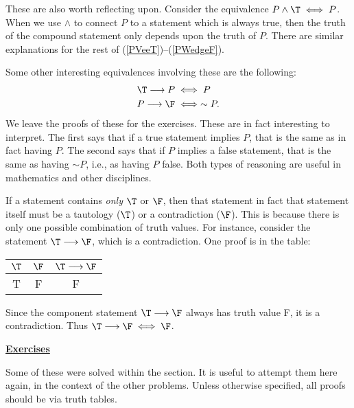 These are also worth reflecting upon.  Consider the equivalence
$P\wedge\T\iff P$.  When we use $\wedge$ to
connect $P$ to a statement which
is always true, then the truth of the compound 
statement only depends upon the truth of $P$.
There are similar explanations for the rest of 
(\ref{PVeeT})--(\ref{PWedgeF}).

Some other interesting equivalences involving these are the 
following:
\begin{align}
\T\longrightarrow P&\iff P\\
P\longrightarrow\F&\iff \sim P.\label{RedAdButAsEquivalence}\end{align}
We leave the proofs of
these for the exercises.  These are in fact interesting to
interpret.  The first says that if a true statement implies $P$,
that is the same as in fact having $P$.  The second says that if
$P$ implies a false statement, that is the same as having $\sim P$,
i.e., as having $P$ false.  Both types of reasoning are useful
in mathematics and other disciplines.

If a statement contains {\it only} $\T$ or $\F$, then that statement
in fact that statement itself must be a tautology ($\T$) or
a contradiction ($\F$).  This is because there is only one 
possible combination of truth values. For instance, consider
the statement $\T\longrightarrow\F$, which is a contradiction.
One proof is in the table:
\begin{center}
\begin{tabular}{|c|c||c|}
\hline
$\T$&$\F$&$\T\longrightarrow\F$\\
\hline
T&F&F\\
\hline
\end{tabular}
\end{center}
Since the component statement $\T\longrightarrow\F$
always has truth value F, it is a contradiction.  Thus
$\T\longrightarrow\F\iff\F$.

\newpage
\begin{center}\underline{\Large{\bf Exercises}}\end{center}

Some  of these were solved within the section.
It is useful to attempt them here again, in 
the context of the other problems.  Unless otherwise specified, 
all proofs should be via truth tables.

